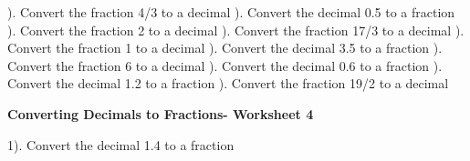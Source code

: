 \documentclass{article}%
\begin{document}
\newline%
\newline%
). Convert the fraction 4/3 to a decimal%
\newline%
\newline%
). Convert the decimal 0.5 to a fraction%
\newline%
\newline%
). Convert the fraction 2 to a decimal%
\newline%
\newline%
). Convert the fraction 17/3 to a decimal%
\newline%
\newline%
). Convert the fraction 1 to a decimal%
\newline%
\newline%
). Convert the decimal 3.5 to a fraction%
\newline%
\newline%
). Convert the fraction 6 to a decimal%
\newline%
\newline%
). Convert the decimal 0.6 to a fraction%
\newline%
\newline%
). Convert the decimal 1.2 to a fraction%
\newline%
\newline%
). Convert the fraction 19/2 to a decimal%
\newline%
\newline%
\newline%
\pagebreak%
\large%
\begin{center}%
\textbf{Converting Decimals to Fractions- Worksheet 4}%
\newline%
\newline%
\newline%
\end{center} \normalsize%
1). Convert the decimal 1.4 to a fraction%
\newline%
\newline%
\newline%
\end{document}
